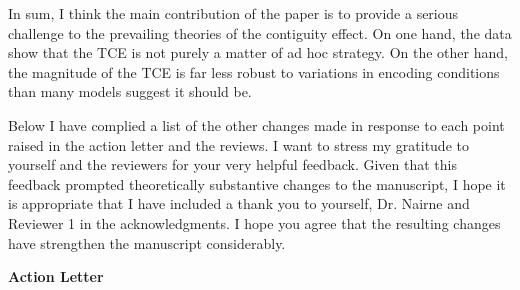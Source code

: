 \documentclass[12pt]{article}
\begin{document}
In sum, I think the main contribution of the paper is to provide a serious challenge to the prevailing theories of the contiguity effect. On one hand, the data show that the TCE is not purely a matter of ad hoc strategy. On the other hand, the magnitude of the TCE is far less robust to variations in encoding conditions than many models suggest it should be. 

Below I have complied a list of the other changes made in response to each point raised in the action letter and the reviews. I want to stress my gratitude to yourself and the reviewers for your very helpful feedback. Given that this feedback prompted theoretically substantive changes to the manuscript, I hope it is appropriate that I have included a thank you to yourself, Dr. Nairne and Reviewer 1 in the acknowledgments. I hope you agree that the resulting changes have strengthen the manuscript considerably.

\vspace{20pt}

\textbf{\large{Action Letter}}
\end{document}
